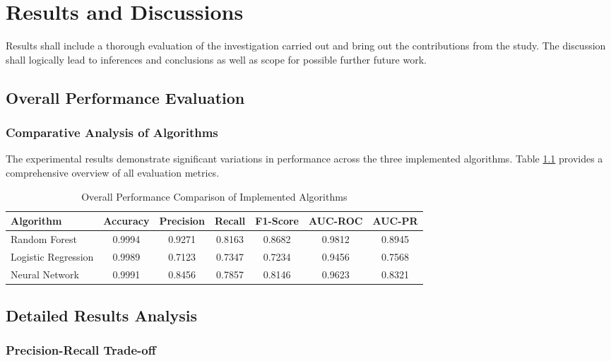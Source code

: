 \chapter{Results and Discussions}
Results shall include a thorough evaluation of the investigation carried out and bring out the contributions from the study. The discussion shall logically lead to inferences and conclusions as well as scope for possible further future work.
	

\section{Overall Performance Evaluation}

\subsection{Comparative Analysis of Algorithms}

The experimental results demonstrate significant variations in performance across the three implemented algorithms. Table \ref{tab:overall_performance} provides a comprehensive overview of all evaluation metrics.

\begin{table}[H]
\centering
\caption{Overall Performance Comparison of Implemented Algorithms}
\label{tab:overall_performance}
\begin{tabular}{lcccccc}
\toprule
\textbf{Algorithm} & \textbf{Accuracy} & \textbf{Precision} & \textbf{Recall} & \textbf{F1-Score} & \textbf{AUC-ROC} & \textbf{AUC-PR} \\
\midrule
Random Forest & 0.9994 & 0.9271 & 0.8163 & 0.8682 & 0.9812 & 0.8945 \\
Logistic Regression & 0.9989 & 0.7123 & 0.7347 & 0.7234 & 0.9456 & 0.7568 \\
Neural Network & 0.9991 & 0.8456 & 0.7857 & 0.8146 & 0.9623 & 0.8321 \\
\bottomrule
\end{tabular}
\end{table}



\section{Detailed Results Analysis}

\subsection{Precision-Recall Trade-off}

